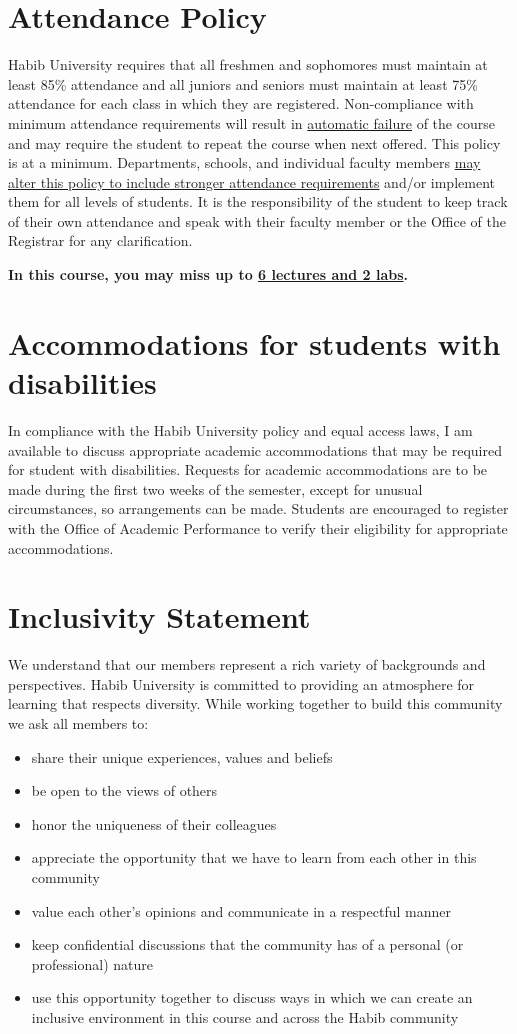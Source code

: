 \documentclass[a4paper]{article}
\begin{document}
\section{Attendance Policy}

Habib University requires that all freshmen and sophomores must maintain at least 85\% attendance and all juniors and seniors must maintain at least 75\% attendance for each class in which they are registered. Non-compliance with minimum attendance requirements will result in \underline{automatic failure} of the course and may require the student to repeat the course when next offered. This policy is at a minimum. Departments, schools, and individual faculty members \underline{may alter this policy to include stronger attendance requirements} and/or implement them for all levels of students.  It is the responsibility of the student to keep track of their own attendance and speak with their faculty member or the Office of the Registrar for any clarification.

{\bf In this course, you may miss up to \underline{6 lectures and 2 labs}.}

\section{Accommodations for students with disabilities}

In compliance with the Habib University policy and equal access laws, I am available to discuss appropriate academic accommodations that may be required for student with disabilities. Requests for academic accommodations are to be made during the first two weeks of the semester, except for unusual circumstances, so arrangements can be made. Students are encouraged to register with the Office of Academic Performance to verify their eligibility for appropriate accommodations.

\section{Inclusivity Statement}

We understand that our members represent a rich variety of backgrounds and perspectives. Habib University is committed to providing an atmosphere for learning that respects diversity. While working together to build this community we ask all members to:
\begin{itemize}
\item share their unique experiences, values and beliefs
\item be open to the views of others 
\item honor the uniqueness of their colleagues
\item appreciate the opportunity that we have to learn from each other in this community
\item value each other's opinions and communicate in a respectful manner
\item keep confidential discussions that the community has of a personal (or professional) nature 
\item use this opportunity together to discuss ways in which we can create an inclusive environment in this course and across the Habib community 
\end{itemize}
\end{document}
